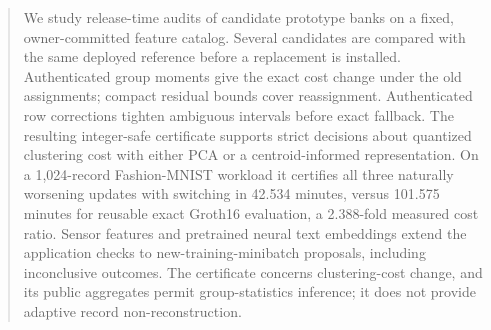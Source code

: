 
\begin{abstract}
We study release-time audits of candidate prototype banks on a fixed,
owner-committed feature catalog. Several candidates are compared with the
same deployed reference before a replacement is installed. Authenticated
group moments give the exact cost change under the old assignments; compact
residual bounds cover reassignment. Authenticated row corrections tighten
ambiguous intervals before exact fallback. The resulting integer-safe
certificate supports strict decisions about quantized clustering cost with
either PCA or a centroid-informed representation. On a 1,024-record
Fashion-MNIST workload it certifies all three naturally worsening updates
with switching in 42.534 minutes, versus 101.575 minutes for reusable exact
Groth16 evaluation, a 2.388-fold measured cost ratio. Sensor features and
pretrained neural text embeddings extend the application checks to
new-training-minibatch proposals, including inconclusive outcomes. The
certificate concerns clustering-cost change, and its public aggregates
permit group-statistics inference; it does not provide adaptive record
non-reconstruction.
\end{abstract}
